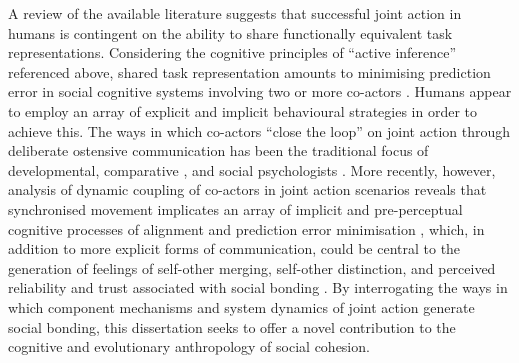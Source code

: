 A review of the available literature suggests that successful joint action in humans is  contingent on the ability to share functionally equivalent task representations. Considering the cognitive principles of ``active inference'' referenced above, shared task representation amounts to minimising prediction error in social cognitive systems involving two or more co-actors \citep{Semin2008,Frith2010}.  Humans appear to employ an array of explicit and implicit behavioural strategies in order to achieve this.   The ways in which co-actors ``close the loop'' \citep{Frith2007} on joint action through deliberate ostensive communication has been the traditional focus of developmental, comparative \cite{Tomasello2005a}, and social psychologists \citep{Sebanz2006}.
More recently, however, analysis of dynamic coupling of co-actors in joint action scenarios reveals that synchronised movement implicates an array of implicit and pre-perceptual cognitive processes of alignment and prediction error minimisation \citep{Schmidt2011}, which, in addition to more explicit forms of communication, could be central to the generation of feelings of self-other merging, self-other distinction, and perceived reliability and trust associated with social bonding \citep{Marsh2009}. By interrogating the ways in which component mechanisms and system dynamics of joint action generate social bonding, this dissertation seeks to offer a novel contribution to the cognitive and evolutionary anthropology of social cohesion.

